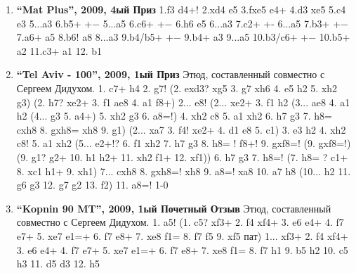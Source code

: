 \begin{enumerate}
\item \textbf{ ``Mat Plus'', 2009, 4ый Приз } 1.\knight{}f3 d4+! 2.\knight{}xd4 e5 3.fxe5 \rook{}e4+ 4.\king{}d3 \rook{}xe5 5.\king{}c4 \rook{}e3
  5...\king{}a3 6.\knight{}b5+ +−
  5...\king{}a5 6.\knight{}c6+ +−
6.\rook{}h6 \rook{}e5
  6...\king{}a3 7.\knight{}c2+ +-
  6...\king{}a5 7.\knight{}b3+ +−
7.\rook{}a6+ \rook{}a5 8.\rook{}b6! \rook{}a8 
  8...\king{}a3 9.\rook{}b4/\knight{}b5+ +−
9.\rook{}b4+ \king{}a3
  9...\king{}a5 10.\knight{}b3/\knight{}c6+ +−
10.\knight{}b5+ \king{}a2 11.\knight{}c3+ \king{}a1 12. \rook{}b1\mate{}

\item \textbf{ ``Tel Aviv - 100'', 2009, 1ый Приз } Этюд, составленный совместно с Сергеем Дидухом.
1. \bishop{}c7+ \king{}h4 2. g7! 
    (2. exd3? \king{}xg5 3. g7 \king{}xh6 4. \bishop{}e5 h2 5. \bishop{}xh2 g3)
    (2. h7? \rook{}xe2+ 3. \king{}f1 \rook{}ae8 4. \rook{}a1 \rook{}f8+) 
2... \rook{}e8! 
    (2... \rook{}xe2+ 3. \king{}f1 h2 
        (3... \rook{}ae8 4. \rook{}a1 h2 
             (4... g3 5. \rook{}a4+) 
        5. \bishop{}xh2 g3 6. a8=\queen{}!) 
    4. \bishop{}xh2 \rook{}c8 5. \rook{}a1 \rook{}xh2 6. h7 \king{}g3 7. h8=\queen{} \rook{}cxh8 8. gxh8=\queen{} \rook{}xh8 9. \king{}g1)
    (2... \rook{}xa7 3. \bishop{}f4! \rook{}xe2+ 4. \king{}d1 \rook{}e8 5. \king{}c1) 
3. e3 h2 4. \bishop{}xh2 \rook{}c8! 5. \rook{}a1 \rook{}xh2 
    (5... \rook{}e2+!? 6. \king{}f1 \rook{}xh2 7. h7 \king{}g3 8. h8=\rook{} ! \rook{}f8+! 9. gxf8=\bishop{}! 
        (9. gxf8=\knight{}!) 
        (9. \king{}g1? \rook{}g2+ 10. \king{}h1 \rook{}h2+ 11. \rook{}xh2 \rook{}f1+ 12. \rook{}xf1)) 
6. h7 \king{}g3 7. h8=\rook{}! 
    (7. h8=\queen{} ? \rook{}c1+ 8. \rook{}xc1 \rook{}h1+ 9. \queen{}xh1) 
7... \rook{}cxh8 8. gxh8=\rook{}! \rook{}xh8 9. a8=\bishop{}! \rook{}xa8 10. a7 \rook{}h8 
    (10... \king{}h2 11. g6 g3 12. g7 g2 13. \king{}f2) 
11. a8=\bishop{}! 1-0

\item \textbf{ ``Kopnin 90 MT'', 2009, 1ый Почетный Отзыв } Этюд, составленный совместно с Сергеем Дидухом.
 1. \rook{}a5! 
    (1. \rook{}c5? \rook{}xf3+ 2. \knight{}f4 \rook{}xf4+ 3. \king{}e6 \rook{}e4+ 4. \king{}f7 \rook{}e7+ 5. \king{}xe7 e1=\queen{}+ 6. \king{}f7 \queen{}e8+ 7. \king{}xe8 f1=\queen{} 8. \king{}f7 \queen{}f5 9. \rook{}xf5 {пат})
1... \rook{}xf3+ 2. \knight{}f4 \rook{}xf4+ 3. \king{}e6 \rook{}e4+ 4. \king{}f7 \rook{}e7+ 5. \king{}xe7 e1=\queen{}+ 6. \king{}f7 \queen{}e8+ 7. \king{}xe8 f1=\queen{} 8. \king{}f7 \queen{}h1 9. \rook{}b5 \queen{}h2 10. \rook{}c5 \queen{}h3 11. \rook{}d5 \queen{}d3 12. \rook{}h5\mate{}


\end{enumerate}
